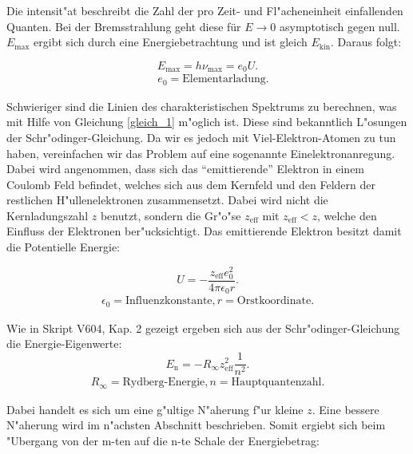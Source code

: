 		Die intensit"at beschreibt die Zahl der pro Zeit- und Fl"acheneinheit einfallenden Quanten.
		Bei der Bremsstrahlung geht diese für $E \rightarrow 0$ asymptotisch gegen null. $E_\mathrm{max}$ ergibt sich durch eine Energiebetrachtung und ist gleich $E_\mathrm{kin}$.
		Daraus folgt:

		\begin{equation}
			E_\mathrm{max} = h\nu_\mathrm{max} = e_\mathrm{0}U. \label{gleich_2}
		\end{equation}
		\begin{eqnarray*}
			\quad e_\mathrm{0} = \text{Elementarladung}.
		\end{eqnarray*}

		Schwieriger sind die Linien des charakteristischen Spektrums zu berechnen, was mit Hilfe von Gleichung \ref{gleich_1} m"oglich ist.
		Diese sind bekanntlich L"osungen der Schr"odinger-Gleichung. 
		Da wir es jedoch mit Viel-Elektron-Atomen zu tun haben, vereinfachen wir das Problem auf eine sogenannte Einelektronanregung.
		Dabei wird angenommen, dass sich das "`emittierende"' Elektron in einem Coulomb Feld befindet, welches sich aus dem Kernfeld und den Feldern der restlichen H"ullenelektronen zusammensetzt.
		Dabei wird nicht die Kernladungszahl $z$ benutzt, sondern die Gr"o"se $z_\mathrm{eff}$ mit $z_\mathrm{eff} < z$, welche den Einfluss der Elektronen ber"ucksichtigt.
		Das emittierende Elektron besitzt damit die Potentielle Energie:

		\begin{equation}
			U = -\frac{z_\mathrm{eff} e_\mathrm{0}^2}{4 \pi \epsilon_\mathrm{0} r}. \label{gleich_3}
		\end{equation}
		\begin{eqnarray*}
			\epsilon_\mathrm{0} = \text{Influenzkonstante,}\, r = \text{Orstkoordinate}.
		\end{eqnarray*}

		Wie in Skript V604, Kap. 2 gezeigt ergeben sich aus der Schr"odinger-Gleichung die Energie-Eigenwerte: 		
		\begin{equation}
			E_\mathrm{n} = - R_\infty z_\mathrm{eff}^2 \frac{1}{n^2}. \label{gleich_4}
		\end{equation}
		\begin{eqnarray*}
			R_\infty = \text{Rydberg-Energie,}\, n = \text{Hauptquantenzahl}.
		\end{eqnarray*}

		Dabei handelt es sich um eine g"ultige N"aherung f"ur kleine $z$.
		Eine bessere N"aherung wird im n"achsten Abschnitt beschrieben.
		Somit ergiebt sich beim "Ubergang von der m-ten auf die n-te Schale der Energiebetrag:

